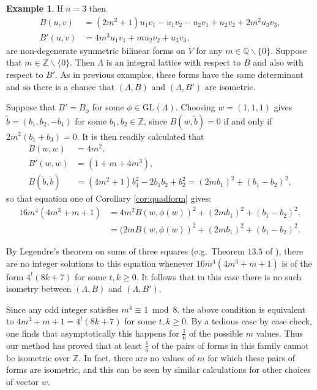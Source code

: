 \documentclass{amsart}
\theoremstyle{plain}
\theoremstyle{definition}
\newtheorem{eg}[theorem]{Example}
\begin{document}
\begin{eg}
\label{eg:rank3gen}
If $n=3$ then \begin{align*}B(u,v) &= (2m^2+1)u_1v_1 - u_1v_2 - u_2v_1 + u_2v_2 + 2m^2u_3v_3,\\ B'(u,v) &= 4m^3u_1v_1 + mu_2v_2 + u_3v_3,\end{align*} are non-degenerate symmetric bilinear forms on $V$ for any $m\in\mathbb{Q}\backslash\{0\}$. Suppose that $m\in\mathbb{Z}\backslash\{0\}$. Then $\Lambda$ is an integral lattice with respect to $B$ and also with respect to $B'$. As in previous examples, these forms have the same determinant and so there is a chance that $(\Lambda,B)$ and $(\Lambda,B')$ are isometric.

Suppose that $B' = B_{\phi}$ for some $\phi\in\text{GL}(\Lambda)$. Choosing $w = (1,1,1)$ gives $\tilde{b} = (b_1, b_2, -b_1)$ for some $b_1,b_2\in\mathbb{Z}$, since $B(w,\tilde{b}) = 0$ if and only if $2m^2(b_1 + b_3) = 0$. It is then readily calculated that \begin{align*}B(w,w) &= 4m^2,\\ B'(w,w) &= (1+m+4m^3),\\ B(\tilde{b},\tilde{b}) &= (4m^2 + 1)b_1^2 - 2b_1b_2 + b_2^2 = (2mb_1)^2 + (b_1-b_2)^2,\end{align*} so that equation one of Corollary \ref{cor:quadform} gives: \begin{align*}16m^4(4m^3+m+1) &= 4m^2B(w,\phi(w))^2 + (2mb_1)^2 + (b_1-b_2)^2,\\ &= (2mB(w,\phi(w))^2 + (2mb_1)^2 + (b_1-b_2)^2.\end{align*}

By Legendre's theorem on sums of three squares (e.g.\ Theorem $13.5$ of \cite{burton}), there are no integer solutions to this equation whenever $16m^4(4m^3+m+1)$ is of the form $4^t(8k+7)$ for some $t,k\geq 0$. It follows that in this case there is no such isometry between $(\Lambda,B)$ and $(\Lambda,B')$.

Since any odd integer satisfies $m^4\equiv 1 \bmod 8$, the above condition is equivalent to $4m^3 + m  + 1 = 4^t(8k+7)$ for some $t,k\geq 0$. By a tedious case by case check, one finds that asymptotically this happens for $\frac{1}{6}$ of the possible $m$ values. Thus our method has proved that at least $\frac{1}{6}$ of the pairs of forms in this family cannot be isometric over $\mathbb{Z}$. In fact, there are no values of $m$ for which these pairs of forms are isometric, and this can be seen by similar calculations for other choices of vector $w$.


\end{eg}
\end{document}
